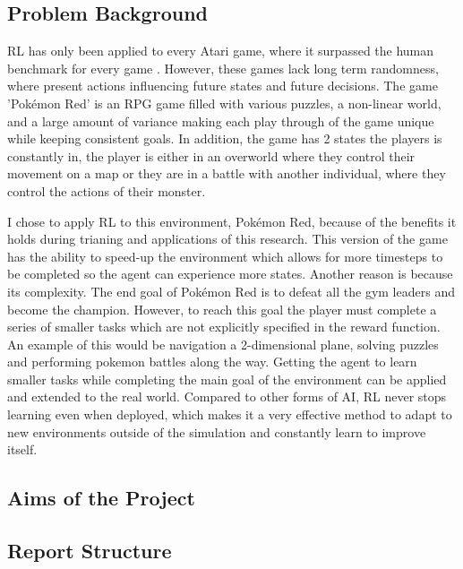 \subsection{Problem Background}

RL has only been applied to every Atari game, where it surpassed the human benchmark for every game \cite{brockman2016openai}. 
However, these games lack long term randomness, where present actions influencing future states and future decisions. The game 'Pokémon Red' is an RPG game filled with various puzzles, a non-linear world, and a large amount of variance making each play through of the game unique while keeping consistent goals. In addition, the game has 2 states the players is constantly in, the player is either in an 
overworld where they control their movement on a map or they are in a battle with another individual, where they control the actions 
of their monster.

I chose to apply RL to this environment, Pokémon Red, because of the benefits it holds during trianing and applications of this 
research. This version of the game has the ability to speed-up the environment which allows for more timesteps to be completed 
so the agent can experience more states. Another reason is because its complexity. The end goal of Pokémon Red is to defeat all the 
gym leaders and become the champion. However, to reach this goal the player must complete a series of smaller tasks which are not 
explicitly specified in the reward function. An example of this would be navigation a 2-dimensional plane, solving puzzles and
 performing pokemon battles along the way. Getting the agent to learn smaller tasks while completing the main goal of the environment 
 can be applied and extended to the real world. Compared to other forms of AI, RL never stops learning even when deployed, which makes
 it a very effective method to adapt to new environments outside of the simulation and constantly learn to improve itself. 

\subsection{Aims of the Project}
\subsection{Report Structure}
